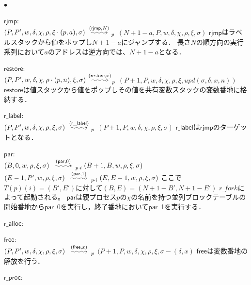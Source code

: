 \documentclass[submit,PRO]{ipsj}
\makeatletter
\newcommand{\longsquiggly}{\xymatrix{{}\ar@{~>}[r]&{}}}
\newcommand{\bcode}[1]{$\mathsf{#1}$}
\newcommand{\brightarrow}[1]{\stackrel{#1}{\longsquiggly}}
\makeatother
\begin{document}
\begin{list}%
 {$\bullet$} %
 {} %
 \item \bcode{rjmp}:\\
$(P,P',w,\delta,\chi,\rho,\xi\cdot(p,a),\sigma)\brightarrow{(\mathsf{rjmp},N)}_p$\newline
\qquad$(N+1-a,P,w,\delta,\chi,\rho,\xi,\sigma)$\newline
\bcode{rjmp}はラベルスタックから値をポップし$N+1-a$にジャンプする．
長さ$N$の順方向の実行系列において$a$のアドレスは逆方向では、$N+1-a$となる．
\item \bcode{restore}:\\
$(P,P',w,\delta,\chi,\rho\cdot(p,n),\xi,\sigma)\brightarrow{(\mathsf{restore},x)}_p$\newline
\qquad$(P+1,P,w,\delta,\chi,\rho,\xi,upd(\sigma,\delta,x,n))$\newline
\bcode{restore}は値スタックから値をポップしその値を共有変数スタックの変数番地に格納する．
\item \bcode{r\_label}:\\
$(P,P',w,\delta,\chi,\rho,\xi,\sigma)\brightarrow{(\mathsf{r\_label})}_p$
\newline
$(P+1,P,w,\delta,\chi,\rho,\xi,\sigma)$\newline
\bcode{r\_label}は\bcode{rjmp}のターゲットとなる．
\item \bcode{par}:\\
$(B,0,w,\rho,\xi,\sigma)\brightarrow{(\mathsf{par},0)}_{p\cdot i}(B+1,B,w,\rho,\xi,\sigma)$\newline
$(E-1,P',w,\rho,\xi,\sigma)\brightarrow{(\mathsf{par},1)}_{p\cdot i}(E,E-1,w,\rho,\xi,\sigma)$\newline
ここで$T(p)(i)=(B',E')$に対して$(B,E)=(N+1-B',N+1-E')$ $r\_fork$によって起動される。
\bcode{par}は親プロセス$p$の$\chi$の名前を持つ並列ブロックテーブルの開始番地から\bcode{par}\ 0を実行し，終了番地において\bcode{par}\ 1を実行する．
\item \bcode{r\_alloc}:\\
\item \bcode{free}:\\
$(P,P',w,\delta,\chi,\rho,\xi,\sigma)\brightarrow{(\mathsf{free},x)}_p$\newline
\qquad $(P+1,P,w,\delta,\chi,\rho,\xi,\sigma-(\delta,x)$\newline
\bcode{free}は変数番地の解放を行う．
\item \bcode{r\_proc}:\\

\end{list}
\end{document}
